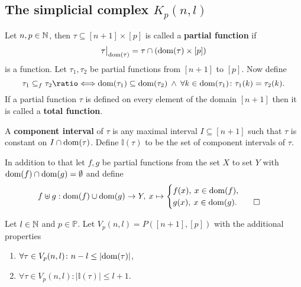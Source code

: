 \subsection{The simplicial complex $K_p(n, l)$}

\begin{defin}
  Let $n, p \in \mathbb{N}$, then $\tau \subseteq [n+1] \times [p]$ is called a \textbf{partial function} if \[\restr{\tau}{\dom(\tau)} = \tau \cap (\dom(\tau) \times [p])\] is a function. Let $\tau_1, \tau_2$ be partial functions from $[n+1]$ to $[p]$. Now define
  \begin{equation*}
    \tau_1 \subseteq_f \tau_2 \longeq \dom(\tau_1) \subseteq \dom(\tau_2) \: \land \: \forall k \in \dom(\tau_1)\colon \tau_1(k) = \tau_2(k).
  \end{equation*}
  If a partial function $\tau$ is defined on every element of the domain $[n+1]$ then it is called a \textbf{total function}.
  
  A \textbf{component interval} of $\tau$ is any maximal interval $I \subseteq [n+1]$ such that $\tau$ is constant on $I \cap {\rm dom}(\tau)$. Define $\mathbb{I}(\tau)$ to be the set of component intervals of $\tau$. 

  In addition to that let $f, g$ be partial functions from the set $X$ to set $Y$ with ${\rm dom}(f) \cap {\rm dom}(g) = \emptyset$ and define 
  \begin{equation*}
    f \uplus g: {\rm dom}(f) \cup {\rm dom}(g) \to Y, \: x \mapsto \begin{cases}
      f(x), \: x \in {\rm dom}(f), \\
      g(x), \: x \in {\rm dom}(g).\qedhere
    \end{cases}
  \end{equation*}
\end{defin}

\begin{defin}
  Let $l \in \mathbb{N}$ and $p \in \mathbb{P}$. Let $V_p(n, l) = P([n+1], [p])$ with the additional properties
  \begin{enumerate}[label=\roman*.)]
    \item $\forall \tau \in V_p(n,l)\colon n - l \leq |{\rm dom}(\tau)|$,
    \item $\forall \tau \in V_p(n,l)\colon \left|\mathbb{I}(\tau)\right| \leq l+1$.\qedhere
  \end{enumerate}
\end{defin}

